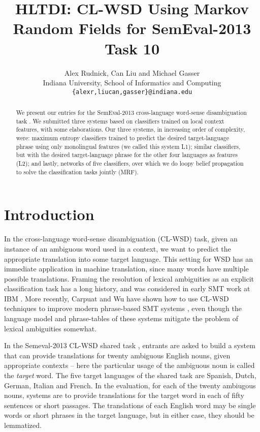 \documentclass[11pt,letterpaper]{article}
\title{HLTDI: CL-WSD Using Markov Random Fields for SemEval-2013 Task 10}
\author{Alex Rudnick, Can Liu and Michael Gasser\\
	    Indiana University, School of Informatics and Computing \\
	    {\tt \{alexr,liucan,gasser\}@indiana.edu}}
\date{}
\begin{document}
\maketitle

\begin{abstract}
We present our entries for the SemEval-2013 cross-language word-sense
disambiguation task \cite{task10}. We submitted three systems based on
classifiers trained on local context features, with some elaborations. Our
three systems, in increasing order of complexity, were: maximum entropy
classifiers trained to predict the desired target-language phrase using only
monolingual features (we called this system L1); similar classifiers,
but with the desired target-language phrase for the other four languages as
features (L2); and lastly, networks of five classifiers, over which we
do loopy belief propagation to solve the classification tasks jointly
(MRF).
\end{abstract}



\section{Introduction}
In the cross-language word-sense disambiguation (CL-WSD) task, given an
instance of an ambiguous word used in a context, we want to predict the
appropriate translation into some target language. This setting for WSD has an
immediate application in machine translation, since many words have multiple
possible translations. Framing the resolution of lexical ambiguities as an
explicit classification task has a long history, and was considered in early
SMT work at IBM \cite{Brown91word-sensedisambiguation}. More recently, Carpuat
and Wu have shown how to use CL-WSD techniques to improve modern phrase-based
SMT systems \cite{carpuatpsd}, even though the language model and phrase-tables
of these systems mitigate the problem of lexical ambiguities somewhat.

In the Semeval-2013 CL-WSD shared task \cite{task10}, entrants are asked to
build a system that can provide translations for twenty ambiguous English
nouns, given appropriate contexts -- here the particular usage of the ambiguous
noun is called the \emph{target} word. The five target languages of the shared
task are Spanish, Dutch, German, Italian and French. In the evaluation, for
each of the twenty ambiugous nouns, systems are to provide translations for
the target word in each of fifty sentences or short passages. The translations
of each English word may be single words or short phrases in the target
language, but in either case, they should be lemmatized.
\end{document}
